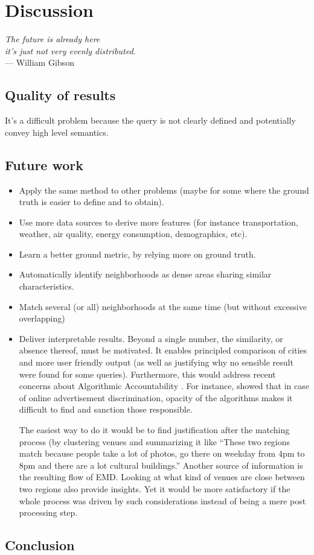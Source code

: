 \chapter{Discussion}
\label{chap:discussion}

\begin{flushright}{\slshape    
		The future is already here \\
		it's just not very evenly distributed.
    } \\ \medskip
    --- William Gibson
\end{flushright}

\section{Quality of results}

It's a difficult problem because the query is not clearly defined and
potentially convey high level semantics.

\section{Future work}
\begin{itemize}
	\item Apply the same method to other problems (maybe for some where the ground truth is easier to define and to obtain).
	\item Use more data sources to derive more features (for instance transportation, weather, air quality, energy consumption, demographics, etc).
	\item Learn a better ground metric, by relying more on ground truth.
	\item Automatically identify neighborhoods as dense areas sharing similar characteristics.
        \item Match several (or all) neighborhoods at the same time (but without excessive overlapping)
	\item Deliver interpretable results. Beyond a single number, the
		similarity, or absence thereof, must be motivated. It enables
		principled comparison of cities and more user friendly output (as well
		as justifying why no sensible result were found for some queries).
		Furthermore, this would address recent concerns about Algorithmic
		Accountability \autocite{Accountability13}. For instance,
		\textcite{Discrimination13} showed that in case of online advertisement
		discrimination, opacity of the algorithms makes it difficult to find
		and sanction those responsible.

		The easiest way to do it would be to find justification after the
		matching process (by clustering venues and summarizing it like
		\enquote{These two regions match because people take a lot of photos,
		go there on weekday from 4pm to 8pm and there are a lot cultural
		buildings.} Another source of information is the resulting flow of
		EMD. Looking at what kind of venues are close between two regions also
		provide insights. Yet it would be more satisfactory if the whole
		process was driven by such considerations instead of being a mere post
		processing step.
\end{itemize}

\section{Conclusion}
